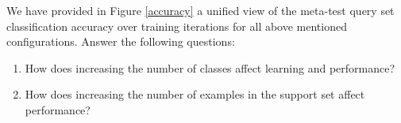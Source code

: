     We have provided in Figure \ref{accuracy} a unified view of the meta-test query set classification accuracy over training iterations for all above mentioned configurations. Answer the following questions:

\begin{enumerate}
    \item How does increasing the number of classes affect learning and performance?
    \item How does increasing the number of examples in the support set affect performance?    
\end{enumerate}

\clearpage